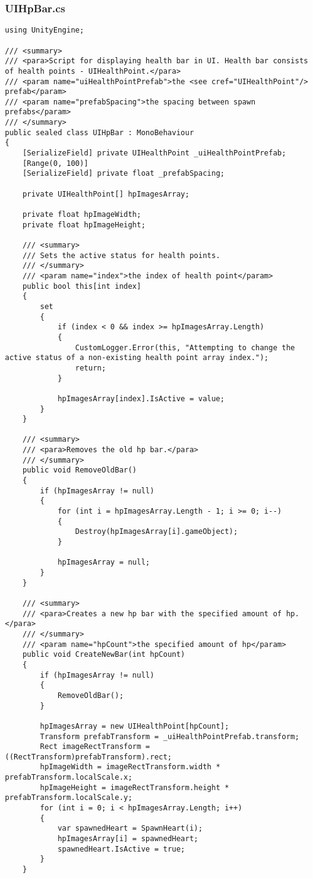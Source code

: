 \subsubsection*{UIHpBar.cs}
\begin{verbatim}
using UnityEngine;

/// <summary>
/// <para>Script for displaying health bar in UI. Health bar consists of health points - UIHealthPoint.</para>
/// <param name="uiHealthPointPrefab">the <see cref="UIHealthPoint"/> prefab</param>
/// <param name="prefabSpacing">the spacing between spawn prefabs</param>
/// </summary>
public sealed class UIHpBar : MonoBehaviour
{
    [SerializeField] private UIHealthPoint _uiHealthPointPrefab;
    [Range(0, 100)] 
    [SerializeField] private float _prefabSpacing;

    private UIHealthPoint[] hpImagesArray;

    private float hpImageWidth;
    private float hpImageHeight;

    /// <summary>
    /// Sets the active status for health points.
    /// </summary>
    /// <param name="index">the index of health point</param>
    public bool this[int index]
    {
        set
        {
            if (index < 0 && index >= hpImagesArray.Length)
            {
                CustomLogger.Error(this, "Attempting to change the active status of a non-existing health point array index.");
                return;
            }

            hpImagesArray[index].IsActive = value;
        }
    }

    /// <summary>
    /// <para>Removes the old hp bar.</para>
    /// </summary>
    public void RemoveOldBar()
    {
        if (hpImagesArray != null)
        {
            for (int i = hpImagesArray.Length - 1; i >= 0; i--)
            {
                Destroy(hpImagesArray[i].gameObject);
            }

            hpImagesArray = null;
        }
    }

    /// <summary>
    /// <para>Creates a new hp bar with the specified amount of hp.</para>
    /// </summary>
    /// <param name="hpCount">the specified amount of hp</param>
    public void CreateNewBar(int hpCount)
    {
        if (hpImagesArray != null)
        {
            RemoveOldBar();
        }

        hpImagesArray = new UIHealthPoint[hpCount];
        Transform prefabTransform = _uiHealthPointPrefab.transform;
        Rect imageRectTransform = ((RectTransform)prefabTransform).rect;
        hpImageWidth = imageRectTransform.width * prefabTransform.localScale.x;
        hpImageHeight = imageRectTransform.height * prefabTransform.localScale.y;
        for (int i = 0; i < hpImagesArray.Length; i++)
        {
            var spawnedHeart = SpawnHeart(i);
            hpImagesArray[i] = spawnedHeart;
            spawnedHeart.IsActive = true;
        }
    }


\end{verbatim}
